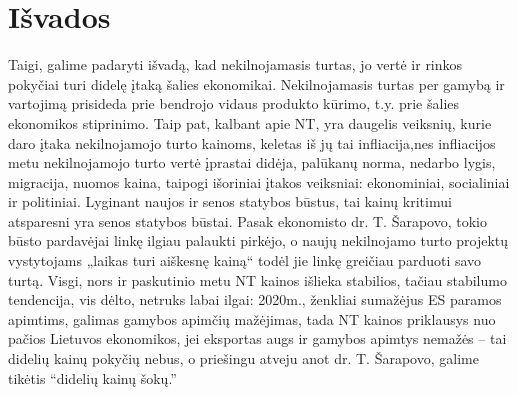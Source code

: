 \documentclass[11pt, titlepage]{article}
\begin{document}
\section{Išvados}
Taigi, galime padaryti išvadą, kad  nekilnojamasis turtas, jo vertė ir rinkos pokyčiai turi didelę įtaką šalies ekonomikai. Nekilnojamasis turtas per gamybą ir vartojimą prisideda prie bendrojo vidaus produkto kūrimo, t.y. prie šalies ekonomikos stiprinimo. \parencite{galiniene2011ekonomikos} Taip pat, kalbant apie NT, yra daugelis veiksnių, kurie daro įtaka nekilnojamojo turto kainoms, keletas iš jų tai infliacija,nes infliacijos metu nekilnojamojo turto vertė įprastai didėja, palūkanų norma, nedarbo lygis, migracija, nuomos kaina, taipogi išoriniai įtakos veiksniai: ekonominiai, socialiniai ir politiniai. Lyginant naujos ir senos statybos būstus, tai kainų kritimui atsparesni yra senos statybos būstai.  Pasak ekonomisto dr. T. Šarapovo, tokio būsto pardavėjai linkę ilgiau palaukti pirkėjo, o naujų nekilnojamo turto projektų vystytojams „laikas turi aiškesnę kainą“ todėl jie linkę greičiau parduoti savo turtą.  Visgi, nors ir paskutinio metu NT kainos išlieka stabilios, tačiau stabilumo tendencija, vis dėlto, netruks labai ilgai: 2020m., ženkliai sumažėjus ES paramos apimtims, galimas gamybos apimčių mažėjimas, tada NT kainos priklausys nuo pačios Lietuvos ekonomikos, jei eksportas augs ir gamybos apimtys nemažės – tai didelių kainų pokyčių nebus, o priešingu atveju anot dr. T. Šarapovo,  galime tikėtis “didelių kainų šokų.”
\newpage
\nocite{*}
\printbibliography[title={Literatūra}]
\end{document}
